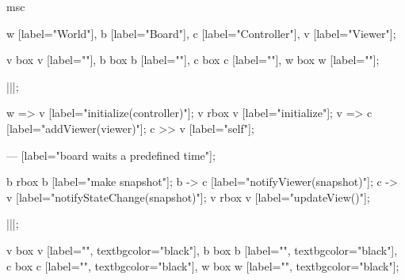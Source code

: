 \begin{msc}
msc
{

w [label="World"],
b [label="Board"],
c [label="Controller"],
v [label="Viewer"];

v box v [label=""],
b box b [label=""],
c box c [label=""],
w box w [label=""];

|||;

w => v [label="initialize(controller)"];
v rbox v [label="initialize"];
v => c [label="addViewer(viewer)"];
c >> v [label="self"];

--- [label="board waits a predefined time"];

b rbox b [label="make snapshot"];
b -> c [label="notifyViewer(snapshot)"];
c -> v [label="notifyStateChange(snapshot)"];
v rbox v [label="updateView()"];

|||;

v box v [label="", textbgcolor="black"],
b box b [label="", textbgcolor="black"],
c box c [label="", textbgcolor="black"],
w box w [label="", textbgcolor="black"];

}
\end{msc}
